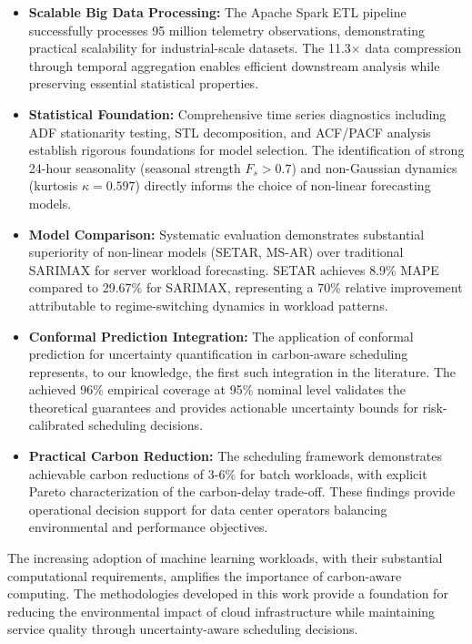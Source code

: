 \documentclass[12pt]{report}
\begin{document}
\begin{itemize}
    \item \textbf{Scalable Big Data Processing:} The Apache Spark ETL pipeline successfully processes 95 million telemetry observations, demonstrating practical scalability for industrial-scale datasets. The 11.3$\times$ data compression through temporal aggregation enables efficient downstream analysis while preserving essential statistical properties.
    
    \item \textbf{Statistical Foundation:} Comprehensive time series diagnostics including ADF stationarity testing, STL decomposition, and ACF/PACF analysis establish rigorous foundations for model selection. The identification of strong 24-hour seasonality (seasonal strength $F_s > 0.7$) and non-Gaussian dynamics (kurtosis $\kappa = 0.597$) directly informs the choice of non-linear forecasting models.
    
    \item \textbf{Model Comparison:} Systematic evaluation demonstrates substantial superiority of non-linear models (SETAR, MS-AR) over traditional SARIMAX for server workload forecasting. SETAR achieves 8.9\% MAPE compared to 29.67\% for SARIMAX, representing a 70\% relative improvement attributable to regime-switching dynamics in workload patterns.
    
    \item \textbf{Conformal Prediction Integration:} The application of conformal prediction for uncertainty quantification in carbon-aware scheduling represents, to our knowledge, the first such integration in the literature. The achieved 96\% empirical coverage at 95\% nominal level validates the theoretical guarantees and provides actionable uncertainty bounds for risk-calibrated scheduling decisions.
    
    \item \textbf{Practical Carbon Reduction:} The scheduling framework demonstrates achievable carbon reductions of 3-6\% for batch workloads, with explicit Pareto characterization of the carbon-delay trade-off. These findings provide operational decision support for data center operators balancing environmental and performance objectives.
\end{itemize}

The increasing adoption of machine learning workloads, with their substantial computational requirements, amplifies the importance of carbon-aware computing. The methodologies developed in this work provide a foundation for reducing the environmental impact of cloud infrastructure while maintaining service quality through uncertainty-aware scheduling decisions.
\end{document}
